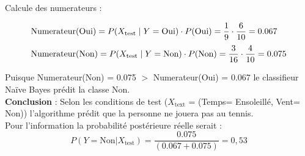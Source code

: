 \documentclass{article}
\begin{document}
\vspace{0.75cm}
Calcule des numerateurs :

\begin{align*}
    &\text{Numerateur(Oui)} = P ( X_{\text{test}} \hspace{0.1cm} | \hspace{0.1cm} Y = \text{Oui})\cdot P(\text{Oui}) = \dfrac{1}{9} \cdot \dfrac{6}{10} = 0.067\\[0.1cm]
    &\text{Numerateur(Non)} = P (X_{\text{test}} \hspace{0.1cm} | \hspace{0.1cm} Y = \text{Non})\cdot P(\text{Non}) = \dfrac{3}{16} \cdot \dfrac{4}{10} = 0.075
\end{align*}

\vspace{0.45cm}

Puisque Numerateur(Non) = 0.075 $>$ Numerateur(Oui) = 0.067 le classifieur Naïve Bayes prédit la classe Non.\\[0.1cm]
\textbf{Conclusion} : Selon les conditions de test ($X_{\text{text}}$ = (Temps= Ensoleillé, Vent= Non)) l'algorithme prédit que la personne ne jouera pas au tennis.\\[0.15cm]

Pour l'information la probabilité postérieure réelle serait :
\[P(Y = \text{Non} | X_{\text{test}}) = \dfrac{0.075}  {(0.067 +0.075)} = 0,53\] 
\end{document}
